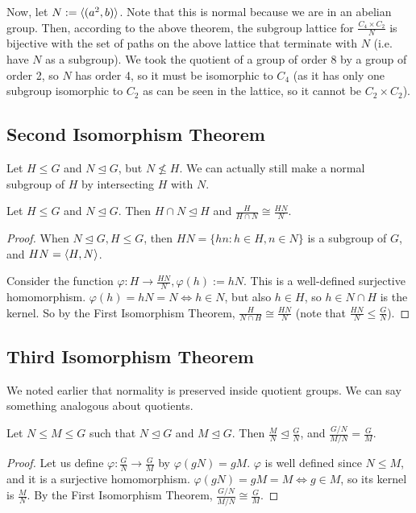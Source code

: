 \documentclass{article}
\begin{document}
Now, let $N := \langle (a^2, b) \rangle$. Note that this is normal because we are in an abelian group. Then, according to the above theorem, the subgroup lattice for $\frac{C_4 \times C_2}{N}$ is bijective with the set of paths on the above lattice that terminate with $N$ (i.e. have $N$ as a subgroup).
We took the quotient of a group of order 8 by a group of order 2, so $N$ has order 4, so it must be isomorphic to $C_4$ (as it has only one subgroup isomorphic to $C_2$ as can be seen in the lattice, so it cannot be $C_2 \times C_2$).

\subsection{Second Isomorphism Theorem}
Let $H\leq G$ and $N\trianglelefteq G$, but $N \nleq H$. We can actually still make a normal subgroup of $H$ by intersecting $H$ with $N$.
\begin{theorem}
	Let $H \leq G$ and $N \trianglelefteq G$. Then $H \cap N \trianglelefteq H$ and $\frac{H}{H \cap N} \cong \frac{HN}{N}$.
\end{theorem}
\begin{proof}
	When $N \trianglelefteq G, H \leq G$, then $HN = \{ hn: h \in H, n \in N \}$ is a subgroup of $G$, and $HN = \langle H, N \rangle$.

	Consider the function $\varphi: H \to \frac{HN}{N}, \varphi(h) := hN$. This is a well-defined surjective homomorphism. $\varphi(h) = hN = N \iff h \in N$, but also $h \in H$, so $h \in N \cap H$ is the kernel. So by the First Isomorphism Theorem, $\frac{H}{N \cap H} \cong \frac{HN}{N}$ (note that $\frac{HN}{N} \leq \frac{G}{N}$).
\end{proof}

\subsection{Third Isomorphism Theorem}
We noted earlier that normality is preserved inside quotient groups. We can say something analogous about quotients.
\begin{theorem}
	Let $N \leq M \leq G$ such that $N \trianglelefteq G$ and $M \trianglelefteq G$. Then $\frac{M}{N} \trianglelefteq \frac{G}{N}$, and $\frac{G/N}{M/N} = \frac{G}{M}$.
\end{theorem}
\begin{proof}
	Let us define $\varphi: \frac{G}{N} \to \frac{G}{M}$ by $\varphi(gN) = gM$. $\varphi$ is well defined since $N \leq M$, and it is a surjective homomorphism. $\varphi(gN) = gM = M \iff g \in M$, so its kernel is $\frac{M}{N}$. By the First Isomorphism Theorem, $\frac{G/N}{M/N} \cong \frac{G}{M}$.
\end{proof}
\end{document}
